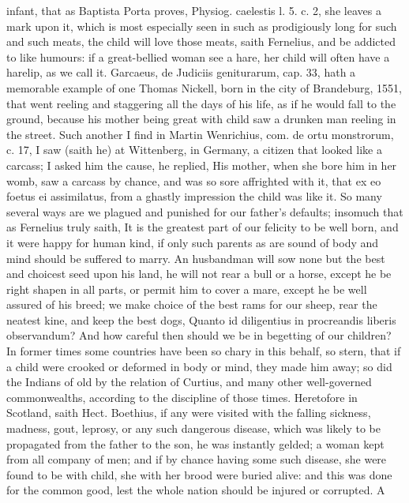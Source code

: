 {infant, that as Baptista Porta proves, Physiog. caelestis l. 5. c. 2,
she leaves a mark upon it, which is most especially seen in such as
prodigiously long for such and such meats, the child will love those
meats, saith Fernelius, and be addicted to like humours: if a
great-bellied woman see a hare, her child will often have a harelip, as
we call it. Garcaeus, de Judiciis geniturarum, cap. 33, hath a
memorable example of one Thomas Nickell, born in the city of
Brandeburg, 1551, that went reeling and staggering all the days
of his life, as if he would fall to the ground, because his mother
being great with child saw a drunken man reeling in the street. Such
another I find in Martin Wenrichius, com. de ortu monstrorum, c. 17, I
saw (saith he) at Wittenberg, in Germany, a citizen that looked like a
carcass; I asked him the cause, he replied, His mother, when she
bore him in her womb, saw a carcass by chance, and was so sore
affrighted with it, that ex eo foetus ei assimilatus, from a ghastly
impression the child was like it.
So many several ways are we plagued and punished for our father's
defaults; insomuch that as Fernelius truly saith, It is the
greatest part of our felicity to be well born, and it were happy for
human kind, if only such parents as are sound of body and mind should
be suffered to marry. An husbandman will sow none but the best and
choicest seed upon his land, he will not rear a bull or a horse, except
he be right shapen in all parts, or permit him to cover a mare, except
he be well assured of his breed; we make choice of the best rams for
our sheep, rear the neatest kine, and keep the best dogs, Quanto id
diligentius in procreandis liberis observandum? And how careful then
should we be in begetting of our children? In former times some
countries have been so chary in this behalf, so stern, that if a
child were crooked or deformed in body or mind, they made him away; so
did the Indians of old by the relation of Curtius, and many other
well-governed commonwealths, according to the discipline of those
times. Heretofore in Scotland, saith Hect. Boethius, if any were
visited with the falling sickness, madness, gout, leprosy, or any such
dangerous disease, which was likely to be propagated from the father to
the son, he was instantly gelded; a woman kept from all company of men;
and if by chance having some such disease, she were found to be with
child, she with her brood were buried alive: and this was done for the
common good, lest the whole nation should be injured or corrupted. A
}
